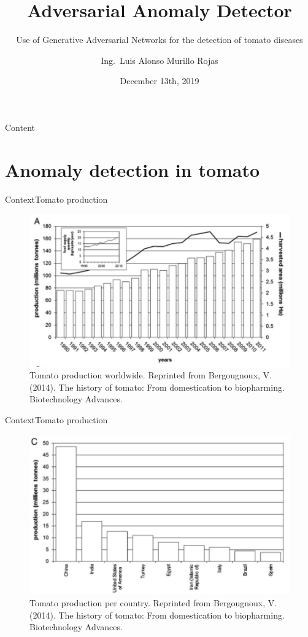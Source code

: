 \documentclass[15pt]{beamer} %
\title[Adversarial Anomaly detector]{Adversarial Anomaly Detector}
\subtitle{Use of Generative Adversarial Networks for the detection of tomato diseases}
\institute[TEC]{Escuela de Ingeniería Electrónica \\ Tecnológico de Costa Rica}
\date[Mayo 2015]{December 13th, 2019}
\author[L.\ Murillo]{Ing.\ Luis Alonso Murillo Rojas}
\begin{document}
\graphicspath{{./}{./fig/}}

\begin{frame}
  \titlepage
\end{frame}


\begin{frame}{Content}
  \tableofcontents
\end{frame}

\section{Anomaly detection in tomato}

\begin{frame}{Context}{\tiny{Tomato production}}
\begin{figure}
 \centering
 \includegraphics[width=.8\textwidth]{tomato_metrics_per_year}
 \tiny{\caption{Tomato production worldwide. Reprinted from Bergougnoux, V. (2014). The history of tomato: From domestication to biopharming. Biotechnology Advances.}}
\end{figure}
\end{frame} 

\begin{frame}{Context}{\tiny{Tomato production}}
 \begin{figure}
 \centering
 \includegraphics[width=.75\textwidth]{tomato_metrics_per_country}
 \tiny{\caption{Tomato production per country. Reprinted from Bergougnoux, V. (2014). The history of tomato: From domestication to biopharming. Biotechnology Advances.}}
\end{figure}
\end{frame}
\end{document}
